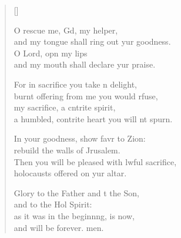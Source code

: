 \begin{verse}[\versewidth]
\begin{patverse}
O rescue me, Gd, my helper,\Med\\
and my tongue shall ring out yur goodness.\\
O Lord, opn my lips\Med\\
and my mouth shall declare yur praise.

For in sacrifice you take n delight,\Med\\
burnt offering from me you would rfuse,\\
my sacrifice, a cntrite spirit,\Med\\
a humbled, contrite heart you will nt spurn.

In your goodness, show favr to Zion:\Med\\
rebuild the walls of Jrusalem.\\
Then you will be pleased with lwful sacrifice,\Med\\
holocausts offered on yur altar.

Glory to the Father and t the Son,\Med\\
and to the Hol Spirit:\\
as it was in the beginn\pointup{\i}ng, is now,\Med\\
and will be forever. men.
  \end{patverse}
  \end{verse}
